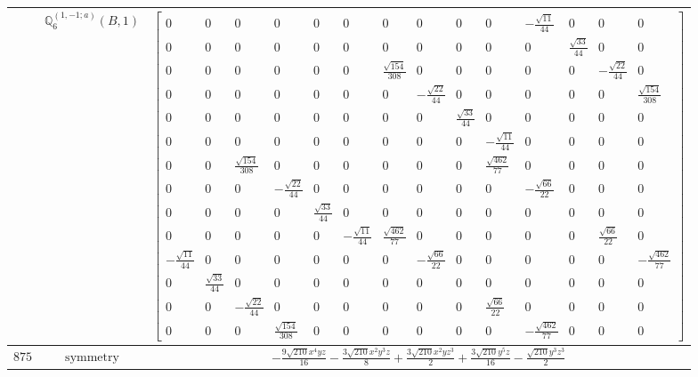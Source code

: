 \documentclass[fleqn,8pt,landscape]{jsarticle}
\begin{document}
\begin{longtable}{ccc}
$  $ & $ \mathbb{Q}_{6}^{(1,-1;a)}(B,1) $ & $ \begin{bmatrix} 0 & 0 & 0 & 0 & 0 & 0 & 0 & 0 & 0 & 0 & - \frac{\sqrt{11}}{44} & 0 & 0 & 0 \\ 0 & 0 & 0 & 0 & 0 & 0 & 0 & 0 & 0 & 0 & 0 & \frac{\sqrt{33}}{44} & 0 & 0 \\ 0 & 0 & 0 & 0 & 0 & 0 & \frac{\sqrt{154}}{308} & 0 & 0 & 0 & 0 & 0 & - \frac{\sqrt{22}}{44} & 0 \\ 0 & 0 & 0 & 0 & 0 & 0 & 0 & - \frac{\sqrt{22}}{44} & 0 & 0 & 0 & 0 & 0 & \frac{\sqrt{154}}{308} \\ 0 & 0 & 0 & 0 & 0 & 0 & 0 & 0 & \frac{\sqrt{33}}{44} & 0 & 0 & 0 & 0 & 0 \\ 0 & 0 & 0 & 0 & 0 & 0 & 0 & 0 & 0 & - \frac{\sqrt{11}}{44} & 0 & 0 & 0 & 0 \\ 0 & 0 & \frac{\sqrt{154}}{308} & 0 & 0 & 0 & 0 & 0 & 0 & \frac{\sqrt{462}}{77} & 0 & 0 & 0 & 0 \\ 0 & 0 & 0 & - \frac{\sqrt{22}}{44} & 0 & 0 & 0 & 0 & 0 & 0 & - \frac{\sqrt{66}}{22} & 0 & 0 & 0 \\ 0 & 0 & 0 & 0 & \frac{\sqrt{33}}{44} & 0 & 0 & 0 & 0 & 0 & 0 & 0 & 0 & 0 \\ 0 & 0 & 0 & 0 & 0 & - \frac{\sqrt{11}}{44} & \frac{\sqrt{462}}{77} & 0 & 0 & 0 & 0 & 0 & \frac{\sqrt{66}}{22} & 0 \\ - \frac{\sqrt{11}}{44} & 0 & 0 & 0 & 0 & 0 & 0 & - \frac{\sqrt{66}}{22} & 0 & 0 & 0 & 0 & 0 & - \frac{\sqrt{462}}{77} \\ 0 & \frac{\sqrt{33}}{44} & 0 & 0 & 0 & 0 & 0 & 0 & 0 & 0 & 0 & 0 & 0 & 0 \\ 0 & 0 & - \frac{\sqrt{22}}{44} & 0 & 0 & 0 & 0 & 0 & 0 & \frac{\sqrt{66}}{22} & 0 & 0 & 0 & 0 \\ 0 & 0 & 0 & \frac{\sqrt{154}}{308} & 0 & 0 & 0 & 0 & 0 & 0 & - \frac{\sqrt{462}}{77} & 0 & 0 & 0 \end{bmatrix} $ \\ \hline
$ 875 $ & $ \text{symmetry} $ & $ - \frac{9 \sqrt{210} x^{4} y z}{16} - \frac{3 \sqrt{210} x^{2} y^{3} z}{8} + \frac{3 \sqrt{210} x^{2} y z^{3}}{2} + \frac{3 \sqrt{210} y^{5} z}{16} - \frac{\sqrt{210} y^{3} z^{3}}{2} $ \\

\end{longtable}
\end{document}
